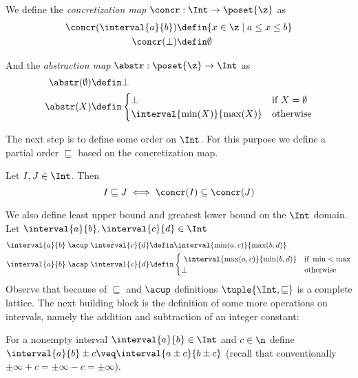 \begin{definition}\label{def:concrint}
  We define the \emph{concretization map} \(\concr : \Int \to
  \poset{\z}\) as
  \begin{align*}
    \concr(\interval{a}{b}) & \defin \{x\in \z \mid a \leq x \leq b\} \\
    \concr(\bot) & \defin \emptyset
  \end{align*}

  And the \emph{abstraction map} \(\abstr:\poset{\z} \to \Int\) as
  \begin{align*}
    \abstr(\emptyset) & \defin \bot \\
    \abstr(X) & \defin
    \begin{cases}
      \bot & \text{if } X = \emptyset \\
      \interval{\min(X)}{\max(X)} & \text{otherwise}
    \end{cases}
  \end{align*}
\end{definition}
The next step is to define some order on \(\Int\). For this purpose
we define a partial order \(\sqsubseteq\) based on the concretization
map.
\begin{definition}\label{def:intpo}
  Let \(I,J \in \Int\). Then
  \begin{equation*}
    I \sqsubseteq J \iff \concr(I) \subseteq \concr(J)
  \end{equation*}
\end{definition}
We also define least upper bound and greatest lower bound on the
\(\Int\) domain. Let \({\interval{a}{b}, \interval{c}{d}\in \Int}\)
\begin{align*}
  \interval{a}{b} \; \acup \; \interval{c}{d} & \defin \interval{\min(a,c)}{\max(b,d)} \\
  \interval{a}{b} \; \acap \; \interval{c}{d} & \defin
                                                \begin{cases} \
                                                  \interval{\max(a,c)}{\min(b,d)} & \text{if } \min < \max \\
                                                  \bot & \text{otherwise}
                                                \end{cases}
\end{align*}
\noindent
Observe that because of \(\sqsubseteq\) and \(\acup\) definitions
\(\tuple{\Int,\sqsubseteq}\) is a complete lattice.  The next building
block is the definition of some more operations on intervals, namely
the addition and subtraction of an integer constant:

\begin{definition}
  \label{de:add}
  For a nonempty interval \(\interval{a}{b} \in \Int\) and
  \(c \in \n\) define
  \(\interval{a}{b} \pm c \veq \interval{a\pm c}{b\pm c}\) (recall
  that conventionally \(\pm \infty + c = \pm\infty - c = \pm\infty\)).
\end{definition}
